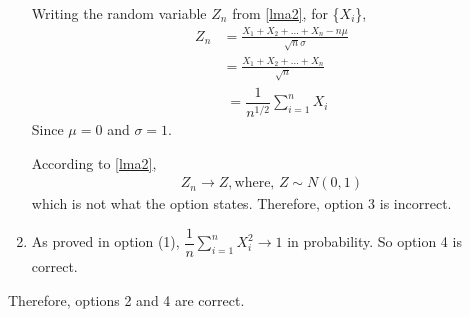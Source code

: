 \documentclass[journal,12pt,twocolumn]{IEEEtran}
\begin{document}
\begin{enumerate}
Writing the random variable $Z_n$ from \ref{lma2}, for \{$X_i$\},
\begin{align}
    Z_n &= \frac{X_1 + X_2 + \ldots + X_n - n\mu}{\sqrt{n}\sigma}\\
    &= \frac{X_1 + X_2 + \ldots + X_n}{\sqrt{n}}
\end{align}
\begin{align}
    &= \dfrac{1}{n^{1/2}} \sum_{i=1}^n X_i
\end{align}
Since $\mu = 0$ and $\sigma = 1$.

According to \ref{lma2}, 
\begin{align}
    Z_n \to Z, \text{where, } Z \sim N(0,1)
\end{align}
which is not what the option states. Therefore, option 3 is incorrect.

\item As proved in option (1), $\dfrac{1}{n}\sum_{i=1}^n X_i^2 \to 1$ in probability. So option 4 is correct.
\end{enumerate}
Therefore, options 2 and 4 are correct.
\end{document}
